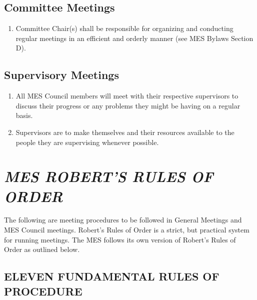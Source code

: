 \hypertarget{committee-meetings}{%
 \subsection{Committee Meetings}
 \label{committee-meetings}}
\begin{enumerate}
 \item
  Committee Chair(s) shall be responsible for organizing and conducting
  regular meetings in an efficient and orderly manner (see MES Bylaws
  Section D).

\end{enumerate}

\hypertarget{supervisory-meetings}{%
 \subsection{Supervisory Meetings}
 \label{supervisory-meetings}}
\begin{enumerate}
 \item
  All MES Council members will meet with their respective supervisors to
  discuss their progress or any problems they might be having on a
  regular basis.
 \item
  Supervisors are to make themselves and their resources available to
  the people they are supervising whenever possible.
\end{enumerate}

\hypertarget{mes-roberts-rules-of-order}{%
 \section{\texorpdfstring{\emph{MES ROBERT'S RULES OF
     ORDER}}{MES ROBERT'S RULES OF ORDER}}
 \label{mes-roberts-rules-of-order}}
The following are meeting procedures to be followed in General Meetings
and MES Council meetings. Robert's Rules of Order is a strict, but
practical system for running meetings. The MES follows its own version
of Robert's Rules of Order as outlined below.

\hypertarget{eleven-fundamental-rules-of-procedure}{%
 \subsection{ELEVEN FUNDAMENTAL RULES OF
  PROCEDURE}
 \label{eleven-fundamental-rules-of-procedure}}

